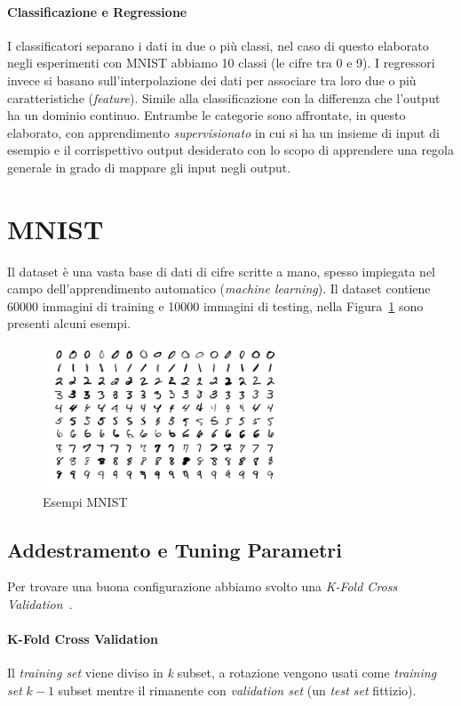 \documentclass[11pt,a4paper,twoside,
openright]{book}
\begin{document}
\paragraph*{Classificazione e Regressione}
I classificatori separano i dati in due o più classi, nel caso di questo elaborato negli esperimenti con MNIST abbiamo 10 classi (le cifre tra 0 e 9).
I regressori invece si basano sull'interpolazione dei dati per associare tra loro due o più caratteristiche (\textit{feature}). Simile alla classificazione con la differenza che l'output ha un dominio continuo.
Entrambe le categorie sono affrontate, in questo elaborato, con apprendimento \textit{supervisionato} in cui si ha un insieme di input di esempio e il corrispettivo output desiderato con lo scopo di apprendere una regola generale in grado di mappare gli input negli output.

\section{MNIST}
Il dataset è una vasta base di dati di cifre scritte a mano, spesso impiegata nel campo dell'apprendimento automatico (\textit{machine learning}).
Il dataset contiene 60000 immagini di training e 10000 immagini di testing, nella Figura~\ref{fig:mnist} sono presenti alcuni esempi.
\begin{figure}[h!]
\begin{center}
\includegraphics[width=200pt]{MnistExamples.png}
\caption{Esempi MNIST~\cite{pict_mnist}}
\end{center}
\label{fig:mnist}
\end{figure}

\subsection{Addestramento e Tuning Parametri}
Per trovare una buona configurazione abbiamo svolto una \textit{K-Fold Cross Validation}~\cite{Refaeilzadeh2009}.
\paragraph*{K-Fold Cross Validation}
Il \textit{training set} viene diviso in \textit{k} subset, a rotazione vengono usati come \textit{training set} $k-1$ subset mentre il rimanente con \textit{validation set} (un \textit{test set} fittizio).
\end{document}

